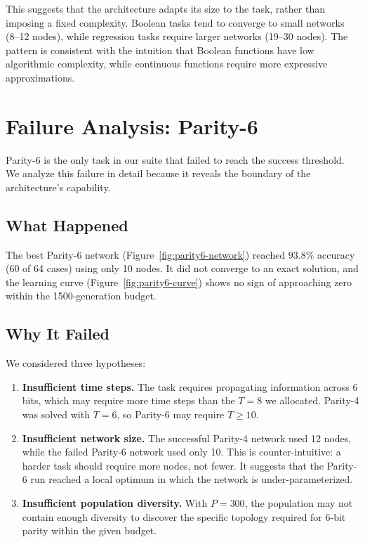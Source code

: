 This suggests that the architecture adapts its size to the task,
rather than imposing a fixed complexity. Boolean tasks tend to
converge to small networks (8--12 nodes), while regression tasks
require larger networks (19--30 nodes). The pattern is consistent
with the intuition that Boolean functions have low algorithmic
complexity, while continuous functions require more expressive
approximations.

\section{Failure Analysis: Parity-6}
\label{sec:results-failure}

Parity-6 is the only task in our suite that failed to reach the
success threshold. We analyze this failure in detail because it
reveals the boundary of the architecture's capability.

\subsection{What Happened}

The best Parity-6 network (Figure~\ref{fig:parity6-network}) reached
$93.8\%$ accuracy (60 of 64 cases) using only 10 nodes. It did not
converge to an exact solution, and the learning curve
(Figure~\ref{fig:parity6-curve}) shows no sign of approaching zero
within the 1500-generation budget.

\subsection{Why It Failed}

We considered three hypotheses:

\begin{enumerate}
  \item \textbf{Insufficient time steps.} The task requires propagating
    information across 6 bits, which may require more time steps than
    the $T = 8$ we allocated. Parity-4 was solved with $T = 6$, so
    Parity-6 may require $T \geq 10$.

  \item \textbf{Insufficient network size.} The successful Parity-4
    network used 12 nodes, while the failed Parity-6 network used only
    10. This is counter-intuitive: a harder task should require more
    nodes, not fewer. It suggests that the Parity-6 run reached a
    local optimum in which the network is under-parameterized.

  \item \textbf{Insufficient population diversity.} With $P = 300$,
    the population may not contain enough diversity to discover the
    specific topology required for 6-bit parity within the given
    budget.
\end{enumerate}

